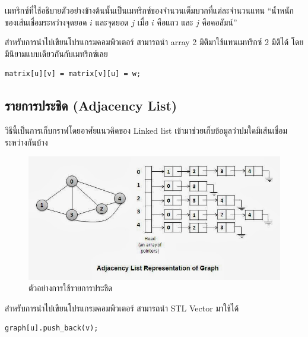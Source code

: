 เมทริกซ์ที่ใช้อธิบายตัวอย่างข้างต้นนั้นเป็นเมทริกซ์ของจำนวนเต็มบวกที่แต่ละจำนวนแทน ``น้ำหนักของเส้นเชื่อมระหว่างจุดยอด $i$  และจุดยอด $j$ เมื่อ $i$ คือแถว และ $j$ คือคอลัมน์''

สำหรับการนำไปเขียนโปรแกรมคอมพิวเตอร์ สามารถนำ array 2 มิติมาใช้แทนเมทริกซ์ 2 มิติได้ โดยมีนิยามแบบเดียวกันกับเมทริกซ์เลย

\begin{lstlisting}
matrix[u][v] = matrix[v][u] = w;
\end{lstlisting}

\newpage

\subsection{รายการประชิด (Adjacency List)}

วิธีนี้เป็นการเก็บกราฟโดยอาศัยแนวคิดของ Linked list เข้ามาช่วยเก็บข้อมูลว่าปมใดมีเส้นเชื่อมระหว่างกันบ้าง

\begin{figure}[h!]
	\centering
    \includegraphics[width=13cm]{images/adjacency-list}
    \caption{ตัวอย่างการใช้รายการประชิด}
    \label{fig:adjacency_list}
\end{figure}

สำหรับการนำไปเขียนโปรแกรมคอมพิวเตอร์ สามารถนำ STL Vector มาใช้ได้

\begin{lstlisting}
graph[u].push_back(v);
\end{lstlisting}

